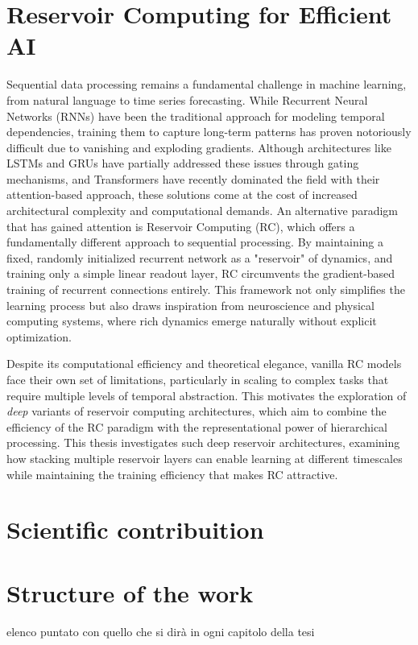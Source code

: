 \section{Reservoir Computing for Efficient AI} 
Sequential data processing remains a fundamental challenge in machine learning, from natural language to time series forecasting.
While Recurrent Neural Networks (RNNs) have been the traditional approach for modeling temporal dependencies, 
training them to capture long-term patterns has proven notoriously difficult due to vanishing and exploding gradients.
Although architectures like LSTMs and GRUs have partially addressed these issues through gating mechanisms,
and Transformers have recently dominated the field with their attention-based approach, these solutions come at the cost
of increased architectural complexity and computational demands.\newline
An alternative paradigm that has gained attention is Reservoir Computing (RC)\cite{}, which offers a fundamentally different approach
to sequential processing. By maintaining a fixed, randomly initialized recurrent network as a "reservoir" of dynamics,
and training only a simple linear readout layer, RC circumvents the gradient-based training of recurrent connections entirely.
This framework not only simplifies the learning process but also draws inspiration from neuroscience and physical computing systems,
where rich dynamics emerge naturally without explicit optimization.\newline

Despite its computational efficiency and theoretical elegance, vanilla RC models face their own set of limitations,
particularly in scaling to complex tasks that require multiple levels of temporal abstraction\cite{}.
This motivates the exploration of \textit{deep} variants \cite{} of reservoir computing architectures,
which aim to combine the efficiency of the RC paradigm with the representational power of hierarchical processing.
This thesis investigates such deep reservoir architectures, examining how stacking multiple reservoir layers
can enable learning at different timescales while maintaining the training efficiency that makes RC attractive.\newline


\section{Scientific contribuition}


\section{Structure of the work}

elenco puntato con quello che si dirà in ogni capitolo della tesi